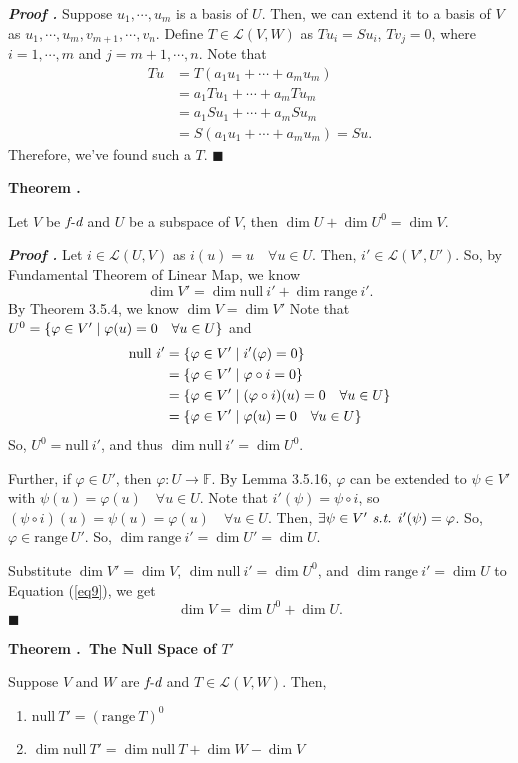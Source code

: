 \documentclass[11pt, letterpaper]{article}
\newcounter{index}[subsection]
\newenvironment*{thm}[1]{\begin{tcolorbox}\par\noindent\textbf{Theorem \thesubsection.\stepcounter{index}\theindex\ #1} \par}{\par\end{tcolorbox}}
\newcounter{nprf}[subsection]
\newenvironment*{prf}{\par\indent\textbf{\textit{Proof \stepcounter{nprf}\thenprf.}}}{\hfill$\blacksquare$\par}
\def\F{\mathbb{F}}
\def\L{\mathcal{L}}
\def\Ua{U^0}
\def\of{\circ}
\def\phi{\varphi}
\def\st{\emph{ s.t. }}
\def\FD{\emph{f-d}}
\def\Null{\mathrm{null\ }}
\def\range{\mathrm{range\ }}
\begin{document}
\begin{prf}
	Suppose $u_1,\cdots,u_m$ is a basis of $U$. Then, we can extend it to a basis of $V$ as $u_1,\cdots,u_m,v_{m+1},\cdots,v_n$. Define $T\in\L(V,W)$ as $Tu_i=Su_i$, $Tv_j=0$, where $i=1,\cdots,m$ and $j=m+1,\cdots,n$. Note that \[\begin{aligned}Tu&=T(a_1u_1+\cdots+a_mu_m)\\&=a_1Tu_1+\cdots+a_mTu_m\\&=a_1Su_1+\cdots+a_mSu_m\\&=S(a_1u_1+\cdots+a_mu_m)=Su.\end{aligned}\] Therefore, we've found such a $T$.
\end{prf}
\begin{thm}{}
	Let $V$ be $\FD$ and $U$ be a subspace of $V$, then $\dim U+\dim\Ua=\dim V.$	
\end{thm}
\begin{prf}
	Let $i\in\L(U,V)$ as $i(u)=u\quad\forall u\in U$. Then, $i'\in\L(V',U')$. So, by Fundamental Theorem of Linear Map, we know \begin{equation}\label{eq9}\dim V'=\dim\Null i'+\dim\range i'.\end{equation} By Theorem 3.5.4, we know $\dim V=\dim V'$ Note that $\Ua=\qty{\phi\in V'\mid\phi(u)=0\quad\forall u\in U}$ and \[\begin{aligned}\Null i'&=\qty{\phi\in V'\mid i'(\phi)=0}\\&=\qty{\phi\in V'\mid\phi\of i=0}\\&=\qty{\phi\in V'\mid(\phi\of i)(u)=0\quad\forall u\in U}\\&=\qty{\phi\in V'\mid\phi(u)=0\quad\forall u\in U}\end{aligned}\] So, $\Ua=\Null i'$, and thus $\dim\Null i'=\dim\Ua$.\par 
	Further, if $\phi\in U'$, then $\phi: U\to\F$. By Lemma 3.5.16, $\phi$ can be extended to $\psi\in V'$ with $\psi(u)=\phi(u)\quad\forall u\in U$. Note that $i'(\psi)=\psi\of i$, so $(\psi\of i)(u)=\psi(u)=\phi(u)\quad\forall u\in U.$ Then, $\exists\psi\in V'\st i'(\psi)=\phi$. So, $\phi\in\range U'$. So, $\dim\range i'=\dim U'=\dim U$.\par 
	Substitute $\dim V'=\dim V$, $\dim\Null i'=\dim\Ua$, and $\dim\range i'=\dim U$ to Equation (\ref{eq9}), we get \[\dim V=\dim\Ua+\dim U.\]
\end{prf}
\begin{thm}{The Null Space of $T'$}
	Suppose $V$ and $W$ are $\FD$ and $T\in\L(V,W)$. Then, 
	\begin{enumerate}
		\item $\Null T'=(\range T)^0$
		\item $\dim\Null T'=\dim\Null T+\dim W-\dim V$
	\end{enumerate}	
\end{thm}
\end{document}
